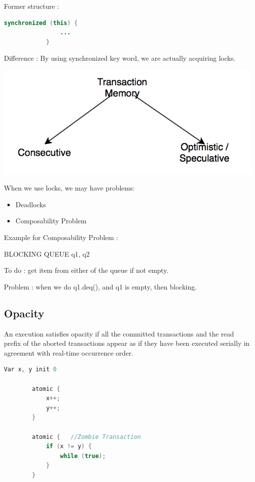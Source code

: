 \documentclass[twoside]{article}
\begin{document}
	Former structure : 
	\begin{center}
		\begin{lstlisting}[language=Java]
		synchronized (this) {
				...
			}
		\end{lstlisting}
	\end{center}
	
	Difference : By using synchronized key word, we are actually acquiring locks. 

	\begin{center}
		\includegraphics[scale=0.7]{tm.png}
	\end{center}

	When we use locks, we may have problems:
	\begin{itemize}
		\item Deadlocks
		\item Composability Problem
	\end{itemize}

	Example for Composability Problem : 
	
	BLOCKING QUEUE q1, q2


	To do : get item from either of the queue if not empty. 


	Problem : when we do q1.deq(), and q1 is empty, then blocking.

	\subsection{Opacity}
	An execution satisfies opacity if all the committed transactions and the read prefix of the aborted transactions appear as if they have been executed serially in agreement with real-time occurrence order.

	\begin{center}
		\begin{lstlisting}[language=Java]
		Var x, y init 0

		atomic {
			x++;
			y++;
		}

		atomic {   //Zombie Transaction
			if (x != y) {
				while (true);
			}
		}
		\end{lstlisting}
	\end{center}
	
\end{document}
